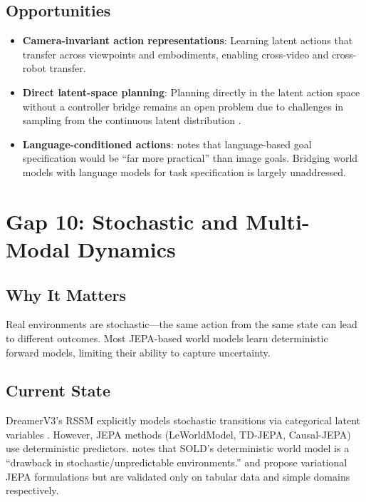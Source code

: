\documentclass[11pt,a4paper]{article}
\begin{document}
\subsection{Opportunities}
\begin{itemize}[noitemsep]
    \item \textbf{Camera-invariant action representations}: Learning latent actions that transfer across viewpoints and embodiments, enabling cross-video and cross-robot transfer.
    \item \textbf{Direct latent-space planning}: Planning directly in the latent action space without a controller bridge remains an open problem due to challenges in sampling from the continuous latent distribution \citep{garrido2026learning}.
    \item \textbf{Language-conditioned actions}: \citet{assran2025vjepa2} notes that language-based goal specification would be ``far more practical'' than image goals. Bridging world models with language models for task specification is largely unaddressed.
\end{itemize}

\section{Gap 10: Stochastic and Multi-Modal Dynamics}

\subsection{Why It Matters}
Real environments are stochastic---the same action from the same state can lead to different outcomes. Most JEPA-based world models learn deterministic forward models, limiting their ability to capture uncertainty.

\subsection{Current State}
DreamerV3's RSSM explicitly models stochastic transitions via categorical latent variables \citep{hafner2023dreamerv3}. However, JEPA methods (LeWorldModel, TD-JEPA, Causal-JEPA) use deterministic predictors. \citet{mosbach2025sold} notes that SOLD's deterministic world model is a ``drawback in stochastic/unpredictable environments.'' \citet{gogl2026varjepa} and \citet{huang2026vjepa} propose variational JEPA formulations but are validated only on tabular data and simple domains respectively.
\end{document}
